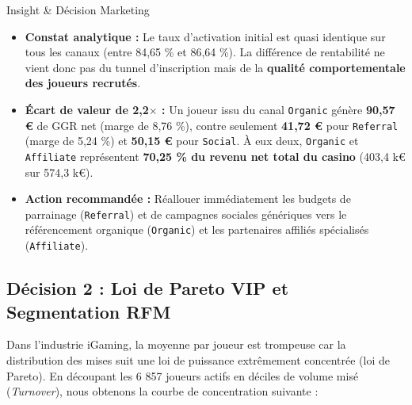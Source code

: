 \documentclass[11pt,a4paper]{article}
\begin{document}
\begin{execbox}{Insight \& Décision Marketing}
\begin{itemize}
    \item \textbf{Constat analytique :} Le taux d'activation initial est quasi identique sur tous les canaux (entre 84,65 \% et 86,64 \%). La différence de rentabilité ne vient donc pas du tunnel d'inscription mais de la \textbf{qualité comportementale des joueurs recrutés}.
    \item \textbf{Écart de valeur de 2,2$\times$ :} Un joueur issu du canal \texttt{Organic} génère \textbf{90,57 \euro} de GGR net (marge de 8,76 \%), contre seulement \textbf{41,72 \euro} pour \texttt{Referral} (marge de 5,24 \%) et \textbf{50,15 \euro} pour \texttt{Social}. À eux deux, \texttt{Organic} et \texttt{Affiliate} représentent \textbf{70,25 \% du revenu net total du casino} (403,4 k\euro{} sur 574,3 k\euro).
    \item \textbf{Action recommandée :} Réallouer immédiatement les budgets de parrainage (\texttt{Referral}) et de campagnes sociales génériques vers le référencement organique (\texttt{Organic}) et les partenaires affiliés spécialisés (\texttt{Affiliate}).
\end{itemize}
\end{execbox}

\subsection{Décision 2 : Loi de Pareto VIP et Segmentation RFM}
Dans l'industrie iGaming, la moyenne par joueur est trompeuse car la distribution des mises suit une loi de puissance extrêmement concentrée (loi de Pareto). En découpant les 6 857 joueurs actifs en déciles de volume misé (\textit{Turnover}), nous obtenons la courbe de concentration suivante :
\end{document}
